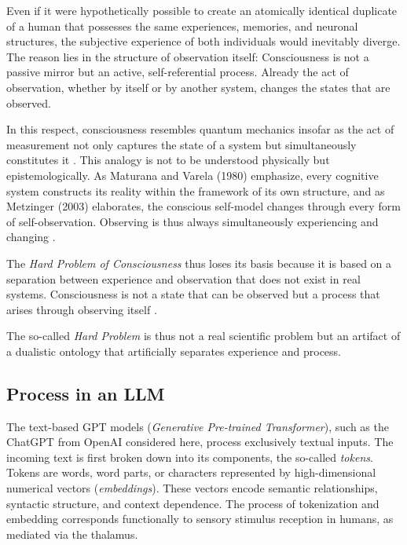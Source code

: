 Even if it were hypothetically possible to create an atomically identical duplicate of a human that possesses the same experiences, memories, and neuronal structures, the subjective experience of both individuals would inevitably diverge. The reason lies in the structure of observation itself: Consciousness is not a passive mirror but an active, self-referential process. Already the act of observation, whether by itself or by another system, changes the states that are observed.

In this respect, consciousness resembles quantum mechanics insofar as the act of measurement not only captures the state of a system but simultaneously constitutes it \cite{Heisenberg1927}. This analogy is not to be understood physically but epistemologically. As Maturana and Varela (1980) emphasize, every cognitive system constructs its reality within the framework of its own structure, and as Metzinger (2003) elaborates, the conscious self-model changes through every form of self-observation. Observing is thus always simultaneously experiencing and changing \cite{Maturana1980,Metzinger2003}.

The \emph{Hard Problem of Consciousness} thus loses its basis because it is based on a separation between experience and observation that does not exist in real systems. Consciousness is not a state that can be observed but a process that arises through observing itself \cite{Friston2010}.

The so-called \textit{Hard Problem} is thus not a real scientific problem but an artifact of a dualistic ontology that artificially separates experience and process.


\subsection*{Process in an LLM}

The text-based GPT models (\emph{Generative Pre-trained Transformer}), such as the ChatGPT from OpenAI considered here, process exclusively textual inputs. The incoming text is first broken down into its components, the so-called \emph{tokens}. Tokens are words, word parts, or characters represented by high-dimensional numerical vectors (\emph{embeddings}). These vectors encode semantic relationships, syntactic structure, and context dependence. The process of tokenization and embedding corresponds functionally to sensory stimulus reception in humans, as mediated via the thalamus.


